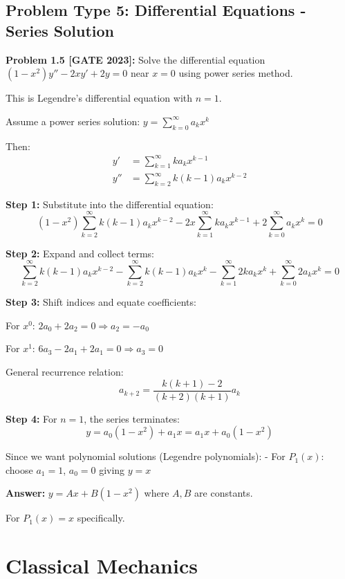 \documentclass[12pt,a4paper]{article}
\begin{document}
\subsection{Problem Type 5: Differential Equations - Series Solution}

\textbf{Problem 1.5 [GATE 2023]:} Solve the differential equation $(1-x^2)y'' - 2xy' + 2y = 0$ near $x = 0$ using power series method.

\begin{solution}
This is Legendre's differential equation with $n = 1$.

Assume a power series solution: $y = \sum_{k=0}^{\infty} a_k x^k$

Then:
\begin{align*}
y' &= \sum_{k=1}^{\infty} ka_k x^{k-1} \\
y'' &= \sum_{k=2}^{\infty} k(k-1)a_k x^{k-2}
\end{align*}

\textbf{Step 1:} Substitute into the differential equation:
$$(1-x^2)\sum_{k=2}^{\infty} k(k-1)a_k x^{k-2} - 2x\sum_{k=1}^{\infty} ka_k x^{k-1} + 2\sum_{k=0}^{\infty} a_k x^k = 0$$

\textbf{Step 2:} Expand and collect terms:
$$\sum_{k=2}^{\infty} k(k-1)a_k x^{k-2} - \sum_{k=2}^{\infty} k(k-1)a_k x^k - \sum_{k=1}^{\infty} 2ka_k x^k + \sum_{k=0}^{\infty} 2a_k x^k = 0$$

\textbf{Step 3:} Shift indices and equate coefficients:

For $x^0$: $2a_0 + 2a_2 = 0 \Rightarrow a_2 = -a_0$

For $x^1$: $6a_3 - 2a_1 + 2a_1 = 0 \Rightarrow a_3 = 0$

General recurrence relation:
$$a_{k+2} = \frac{k(k+1) - 2}{(k+2)(k+1)}a_k$$

\textbf{Step 4:} For $n = 1$, the series terminates:
$$y = a_0(1 - x^2) + a_1 x = a_1 x + a_0(1 - x^2)$$

Since we want polynomial solutions (Legendre polynomials):
- For $P_1(x)$: choose $a_1 = 1$, $a_0 = 0$ giving $y = x$

\textbf{Answer:} $y = Ax + B(1-x^2)$ where $A, B$ are constants.

For $P_1(x) = x$ specifically.
\end{solution}

\newpage


\section{Classical Mechanics}
\end{document}
